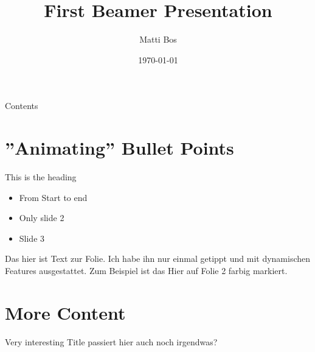 \documentclass[12pt, aspectratio=169]{beamer}
\title{First Beamer Presentation}
\author{Matti Bos}
\date{\today}
\begin{document}
\maketitle

\begin{frame}{Contents}
\tableofcontents
\end{frame}

\section{''Animating'' Bullet Points}
\begin{frame}{This is the heading}

\begin{itemize}
    \item <1-> From Start to end
    \item <2> Only slide 2
    \item <3-> Slide 3
\end{itemize}

Das hier ist Text zur Folie. Ich habe ihn nur einmal getippt und mit dynamischen Features ausgestattet. Zum Beispiel ist \alert<2>{das Hier auf Folie 2} farbig markiert.

\vspace{2em}


\end{frame}

\section{More Content}
\begin{frame}{Very interesting Title}
passiert hier auch noch irgendwas?
    

\end{frame}
\end{document}
